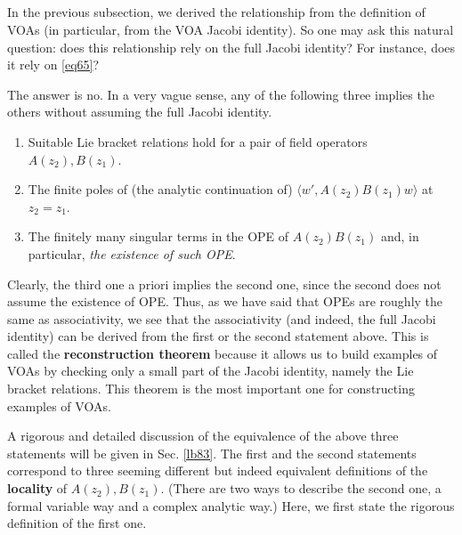 \documentclass[11pt,b5paper,notitlepage]{article}
\theoremstyle{definition}
\theoremstyle{plain}
\newcommand{\bk}[1]{\langle {#1}\rangle}
\numberwithin{equation}{section}
\begin{document}
\subsection{}\label{lb57}

In the previous subsection, we derived the relationship from the definition of VOAs (in particular, from the VOA Jacobi identity). So one may ask this natural question: does this relationship rely on the full Jacobi identity? For instance, does it rely on \eqref{eq65}?

The answer is no. In a very vague sense, any of the following three implies the others without assuming the full Jacobi identity.
\begin{enumerate}
\item Suitable Lie bracket relations hold for a pair of field operators $A(z_2),B(z_1)$.
\item The finite poles of (the analytic continuation of) $\bk{w',A(z_2)B(z_1)w}$ at $z_2=z_1$.
\item The finitely many singular terms in the OPE of $A(z_2)B(z_1)$ and, in particular, \emph{the existence of such OPE}.
\end{enumerate}
Clearly, the third one a priori implies the second one, since the second does not assume the existence of OPE. Thus, as we have said that OPEs are roughly the same as associativity, we see that the associativity (and indeed, the full Jacobi identity) can be derived from the first or the second statement above. This is called the \textbf{reconstruction theorem} because it allows us to build examples of VOAs by checking only a small part of the Jacobi identity, namely the Lie bracket relations. This theorem is the most important one for constructing examples of VOAs.

A rigorous and detailed discussion of the equivalence of the above three statements will be given in Sec. \ref{lb83}. The first and the second statements correspond to three seeming different but indeed equivalent definitions of the \textbf{locality} of $A(z_2),B(z_1)$. (There are two ways to describe the second one, a formal variable way and a complex analytic way.) Here, we first state the rigorous definition of the first one.



\subsection{}
\end{document}
